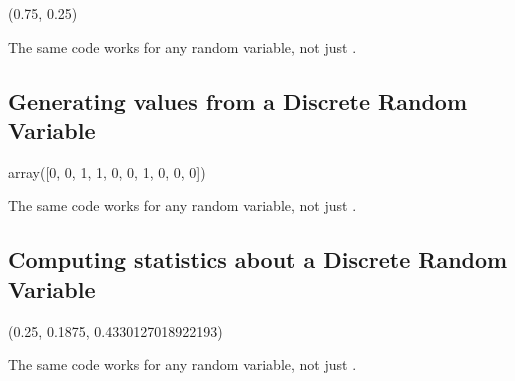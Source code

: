 \documentclass[letterpaper,10pt,english]{sphinxmanual}
\begin{document}
\begin{sphinxVerbatim}[commandchars=\\\{\}]
(0.75, 0.25)
\end{sphinxVerbatim}

The same code works for any random variable, not just .


\subsection{Generating values from a Discrete Random Variable}
\label{\detokenize{GB213-review-in-Python:generating-values-from-a-discrete-random-variable}}
\begin{sphinxVerbatim}[commandchars=\\\{\}]
    
\end{sphinxVerbatim}

\begin{sphinxVerbatim}[commandchars=\\\{\}]
array([0, 0, 1, 1, 0, 0, 1, 0, 0, 0])
\end{sphinxVerbatim}

The same code works for any random variable, not just .


\subsection{Computing statistics about a Discrete Random Variable}
\label{\detokenize{GB213-review-in-Python:computing-statistics-about-a-discrete-random-variable}}
\begin{sphinxVerbatim}[commandchars=\\\{\}]
    
\end{sphinxVerbatim}

\begin{sphinxVerbatim}[commandchars=\\\{\}]
(0.25, 0.1875, 0.4330127018922193)
\end{sphinxVerbatim}

The same code works for any random variable, not just .
\end{document}
